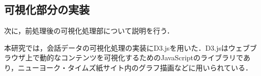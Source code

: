 \documentclass[shuuron]{kuee}
\begin{document}













\subsection{可視化部分の実装} %

次に，前処理後の可視化処理部について説明を行う．





本研究では，会話データの可視化処理の実装にD3.js\cite{vand3}を用いた．D3.jsはウェブブラウザ上で動的なコンテンツを可視化するためのJavaScriptのライブラリであり，ニューヨーク・タイムズ紙サイト内のグラフ描画などに用いられている．
\end{document}

